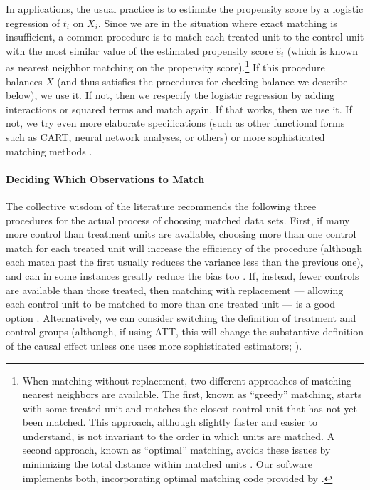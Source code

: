\documentclass[11pt,titlepage]{article}
\begin{document}
In applications, the usual practice is to estimate the propensity
score by a logistic regression of $t_i$ on $X_i$.  Since we are in the
situation where exact matching is insufficient, a common procedure is to
match each treated unit to the control unit with the most similar
value of the estimated propensity score $\hat{e}_i$ (which is known as
nearest neighbor matching on the propensity score).\footnote{When
  matching without replacement, two different approaches of matching
  nearest neighbors are available. The first, known as ``greedy''
  matching, starts with some treated unit and matches the closest
  control unit that has not yet been matched.  This approach, although
  slightly faster and easier to understand, is not invariant to the
  order in which units are matched.  A second approach, known as
  ``optimal'' matching, avoids these issues by minimizing the total
  distance within matched units \citep[e.g.,][]{Rosenbaum89}.  Our
  software implements both, incorporating optimal matching code
  provided by \citet{Hansen04}.}  If this procedure balances $X$ (and
thus satisfies the procedures for checking balance we describe below),
we use it.  If not, then we respecify the logistic regression by
adding interactions or squared terms and match again.  If that works,
then we use it.  If not, we try even more elaborate specifications
(such as other functional forms such as CART, neural network analyses,
or others) or more sophisticated matching methods
\citep{Frolich04,SmiTod05}.

\paragraph{Deciding Which Observations to Match}
The collective wisdom of the literature recommends the following three
procedures for the actual process of choosing matched data sets.
First, if many more control than treatment units are available,
choosing more than one control match for each treated unit will
increase the efficiency of the procedure (although each match past the
first usually reduces the variance less than the previous one), and
can in some instances greatly reduce the bias too \citep{Smith97}.
If, instead, fewer controls are available than those treated, then
matching with replacement --- allowing each control unit to be matched
to more than one treated unit --- is a good option \citep{DehWah99}.
Alternatively, we can consider switching the definition of treatment
and control groups (although, if using ATT, this will change the
substantive definition of the causal effect unless one uses more
sophisticated estimators; \citealt{Lechner00}).
\end{document}
